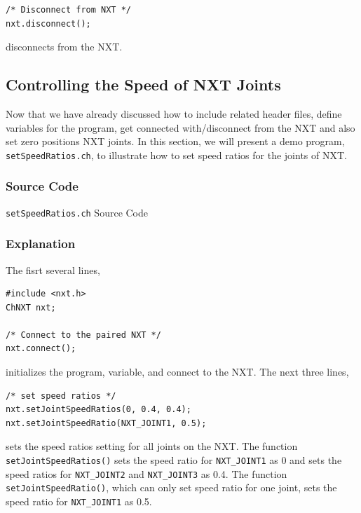 \documentclass[11pt]{article}
\begin{document}
\begin{verbatim}
/* Disconnect from NXT */
nxt.disconnect();
\end{verbatim}

disconnects from the NXT.

\subsection{\label{sec:speed_demo}Controlling the Speed of NXT Joints}
Now that we have already discussed how to include related header files, define variables for the program, 
get connected with/disconnect from the NXT and also set zero positions NXT joints. In this section, we will 
present a demo program, \texttt{setSpeedRatios.ch}, to illustrate how to set speed ratios for the joints of NXT.

\subsubsection*{Source Code}
\begin{Program}[H]
    {\small}
    \caption{\texttt{setSpeedRatios.ch} Source Code\label{prog_setSpeedRatios.ch}}
\end{Program}

\subsubsection*{Explanation}
The fisrt several lines,

\begin{verbatim}
#include <nxt.h>
ChNXT nxt;

/* Connect to the paired NXT */
nxt.connect();
\end{verbatim}

initializes the program, variable, and connect to the NXT. The next three lines,

\begin{verbatim}
/* set speed ratios */
nxt.setJointSpeedRatios(0, 0.4, 0.4);
nxt.setJointSpeedRatio(NXT_JOINT1, 0.5);
\end{verbatim}

sets the speed ratios setting for all joints on the NXT. The function \texttt{setJointSpeedRatios()} sets 
the speed ratio for \texttt{NXT\_JOINT1} as 0 and sets the speed ratios for \texttt{NXT\_JOINT2} and 
\texttt{NXT\_JOINT3} as 0.4. The function \texttt{setJointSpeedRatio()}, which can only set speed ratio
for one joint, sets the speed ratio for \texttt{NXT\_JOINT1} as 0.5.\\
\end{document}
